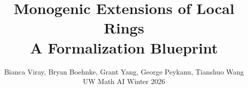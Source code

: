 \documentclass[a4paper]{report}
\title{Monogenic Extensions of Local Rings\\{\large A Formalization Blueprint}}
\author{Bianca Viray, Bryan Boehnke, Grant Yang, George Peykanu, Tianshuo Wang\\
UW Math AI Winter 2026}
\begin{document}
\sloppy
\maketitle

\end{document}
